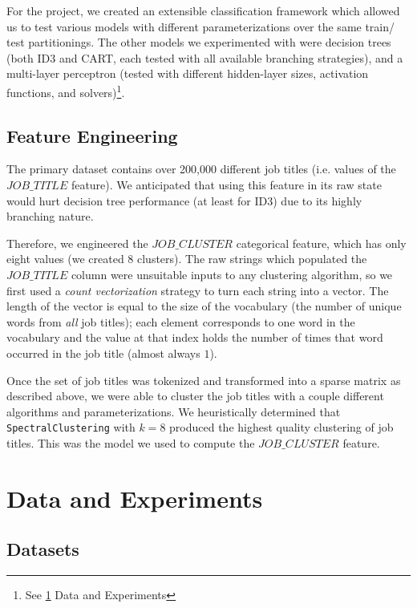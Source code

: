 \documentclass[sigconf]{acmart}
\begin{document}
For the project, we created an extensible classification framework which allowed us to test
various models with different parameterizations over the same train/ test partitionings. The other
models we experimented with were decision trees (both ID3 and CART, each tested with all available
branching strategies), and a multi-layer perceptron (tested with different hidden-layer sizes,
activation functions, and solvers)\footnote{See \ref{sec:experiments} Data and Experiments}.

\subsection{Feature Engineering}

The primary dataset contains over 200,000 different job titles (i.e. values of the $JOB\_TITLE$
feature). We anticipated that using this feature in its raw state would hurt decision tree
performance (at least for ID3) due to its highly branching nature.

Therefore, we engineered the $JOB\_CLUSTER$ categorical feature, which has only eight values
(we created 8 clusters). The raw strings which populated the $JOB\_TITLE$ column were unsuitable
inputs to any clustering algorithm, so we first used a {\it count vectorization} strategy to
turn each string into a vector. The length of the vector is equal to the size of the vocabulary
(the number of unique words from {\it all} job titles); each element corresponds to one word in
the vocabulary and the value at that index holds the number of times that word occurred in the
job title (almost always $1$).

Once the set of job titles was tokenized and transformed into a sparse matrix as described above,
we were able to cluster the job titles with a couple different algorithms and parameterizations.
We heuristically determined that \texttt{SpectralClustering} with $k = 8$ produced the highest
quality clustering of job titles. This was the model we used to compute the $JOB\_CLUSTER$ feature.


\section{Data and Experiments}
\label{sec:experiments}

\subsection{Datasets}
\label{subsec:datasets}
\end{document}
